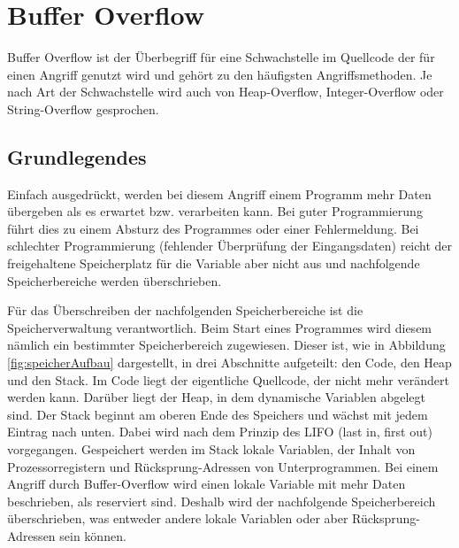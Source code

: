\chapter{Buffer Overflow}
Buffer Overflow ist der Überbegriff für eine Schwachstelle im Quellcode der für einen Angriff genutzt wird und gehört zu den häufigsten Angriffsmethoden. Je nach Art der Schwachstelle wird auch von Heap-Overflow, Integer-Overflow oder String-Overflow gesprochen.

\section{Grundlegendes}
Einfach ausgedrückt, werden bei diesem Angriff einem Programm mehr Daten
übergeben als es erwartet bzw. verarbeiten kann. Bei guter Programmierung
führt dies zu einem Absturz des Programmes oder einer Fehlermeldung. Bei
schlechter Programmierung (fehlender Überprüfung der Eingangsdaten) reicht
der freigehaltene Speicherplatz für die Variable aber nicht aus und nachfolgende Speicherbereiche werden überschrieben.

Für das Überschreiben der nachfolgenden Speicherbereiche ist die Speicherverwaltung verantwortlich. Beim Start eines Programmes wird diesem nämlich ein bestimmter Speicherbereich zugewiesen. Dieser ist, wie in Abbildung \ref{fig:speicherAufbau} dargestellt, in drei Abschnitte aufgeteilt: den Code, den Heap und den Stack. Im Code liegt der eigentliche Quellcode, der nicht mehr verändert werden kann. Darüber liegt der Heap, in dem dynamische Variablen abgelegt sind. Der Stack beginnt am oberen Ende des Speichers und wächst mit jedem Eintrag nach unten. Dabei wird nach dem Prinzip des LIFO (last in, first out) vorgegangen. Gespeichert werden im Stack lokale Variablen, der Inhalt von Prozessorregistern und Rücksprung-Adressen von Unterprogrammen. Bei einem Angriff durch Buffer-Overflow wird einen lokale Variable mit mehr Daten beschrieben, als reserviert sind. Deshalb wird der nachfolgende Speicherbereich überschrieben, was entweder andere lokale Variablen oder aber Rücksprung-Adressen sein können.

